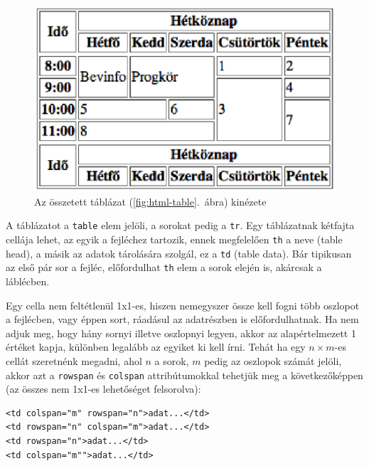 \begin{figure}[tbh]%
\begin{center}%
  \includegraphics[scale=0.7]{html-table-view.eps}%
\end{center}%
  \caption{Az összetett táblázat (\ref{fig:html-table}.\ ábra) kinézete}%
  \label{fig:html-table-view}%
\end{figure}

A táblázatot a \texttt{table} elem jelöli, a sorokat pedig a \texttt{tr}. Egy
táblázatnak kétfajta cellája lehet, az egyik a fejléchez tartozik, ennek
megfelelően \texttt{th} a neve (table head), a másik az adatok tárolására
szolgál, ez a \texttt{td} (table data). Bár tipikusan az első pár sor a fejléc,
előfordulhat \texttt{th} elem a sorok elején is, akárcsak a láblécben.

Egy cella nem feltétlenül 1x1-es, hiszen nemegyszer össze kell fogni több
oszlopot a fejlécben, vagy éppen sort, ráadásul az adatrészben is
előfordulhatnak. Ha nem adjuk meg, hogy hány sornyi illetve oszlopnyi legyen,
akkor az alapértelmezett 1 értéket kapja, különben legalább az egyiket ki kell
írni. Tehát ha egy $n\times m$-es cellát szeretnénk megadni, ahol $n$ a sorok,
$m$ pedig az oszlopok számát jelöli, akkor azt a \texttt{rowspan} és
\texttt{colspan} attribútumokkal tehetjük meg a következőképpen (az összes nem
1x1-es lehetőséget felsorolva):

\begin{Verbatim}[frame=single]
<td colspan="m" rowspan="n">adat...</td>
<td rowspan="n" colspan="m">adat...</td>
<td rowspan="n">adat...</td>
<td colspan="m"">adat...</td>
\end{Verbatim}

